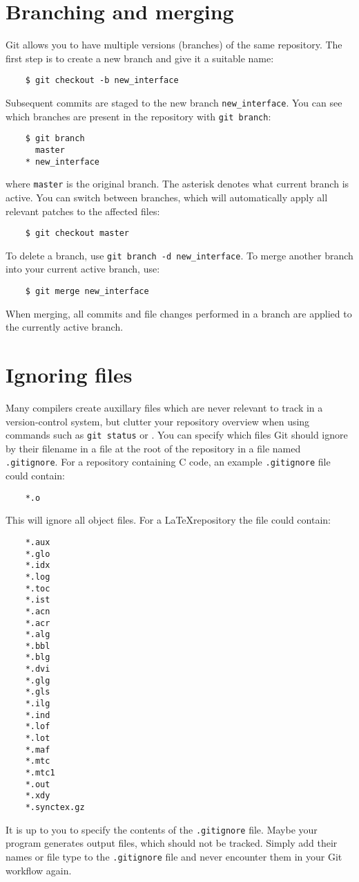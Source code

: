\documentclass[11pt]{article}
\begin{document}
\section{Branching and merging}
Git allows you to have multiple versions (branches) of the same repository.  The 
first step is to create a new branch and give it a suitable name:
\begin{lstlisting}
    $ git checkout -b new_interface
\end{lstlisting}
Subsequent commits are staged to the new branch \texttt{new\_interface}.  You 
can see which branches are present in the repository with \texttt{git branch}:
\begin{lstlisting}
    $ git branch
      master
    * new_interface
\end{lstlisting}
where \texttt{master} is the original branch.  The asterisk denotes what current 
branch is active.  You can switch between branches, which will automatically 
apply all relevant patches to the affected files:
\begin{lstlisting}
    $ git checkout master
\end{lstlisting}
To delete a branch, use \texttt{git branch -d new\_interface}.  To merge another 
branch into your current active branch, use:
\begin{lstlisting}
    $ git merge new_interface
\end{lstlisting}
When merging, all commits and file changes performed in a branch are applied to 
the currently active branch.

\section{Ignoring files}
Many compilers create auxillary files which are never relevant to track in a 
version-control system, but clutter your repository overview when using commands 
such as \texttt{git status} or .  You can specify which 
files Git should ignore by their filename in a file at the root of the 
repository in a file named \texttt{.gitignore}.
For a repository containing C code, an example \texttt{.gitignore} file could 
contain:
\begin{lstlisting}
    *.o
\end{lstlisting}
This will ignore all object files.  For a \LaTeX repository the file could 
contain:
\begin{lstlisting}
    *.aux
    *.glo
    *.idx
    *.log
    *.toc
    *.ist
    *.acn
    *.acr
    *.alg
    *.bbl
    *.blg
    *.dvi
    *.glg
    *.gls
    *.ilg
    *.ind
    *.lof
    *.lot
    *.maf
    *.mtc
    *.mtc1
    *.out
    *.xdy
    *.synctex.gz
\end{lstlisting}
It is up to you to specify the contents of the \texttt{.gitignore} file.  Maybe 
your program generates output files, which should not be tracked. Simply add 
their names or file type to the \texttt{.gitignore} file and never encounter 
them in your Git workflow again.
\end{document}
